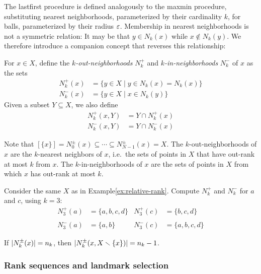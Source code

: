 \documentclass[
]{article}
\begin{document}
The lastfirst procedure is defined analogously to the maxmin procedure,
substituting nearest neighborhoods, parameterized by their cardinality
\(k\), for balls, parameterized by their radius \(\varepsilon\). Membership in
nearest neighborhoods is not a symmetric relation: It may be that
\(y \in N_k(x)\) while \(x \notin N_k(y)\). We therefore introduce a
companion concept that reverses this relationship:

\begin{definition}[$k$-neighborhoods]
    For $x \in X$, define the \emph{$k$-out-neighborhoods} $N^+_k$ and \emph{$k$-in-neighborhoods} $N^-_k$ of $x$ as the sets
    \begin{align*}
        N^+_k(x) &= \{ y\in X \mid y \in N_k(x) = N_k(x) \} \\
        N^-_k(x) &= \{ y\in X \mid x \in N_k(y) \}
    \end{align*}
    Given a subset $Y \subseteq X$, we also define
    \begin{align*}
        N^+_k(x,Y) &= Y \cap N^+_k(x) \\
        N^-_k(x,Y) &= Y \cap N^-_k(x)
    \end{align*}
\end{definition}

Note that
\([\{x\}] = N^\pm_0(x) \subseteq \cdots \subseteq N^\pm_{N-1}(x) = X\).
The \(k\)-out-neighborhoods of \(x\) are the \(k\)-nearest neighbors of
\(x\), i.e.~the sets of points in \(X\) that have out-rank at most \(k\)
from \(x\). The \(k\)-in-neighborhoods of \(x\) are the sets of points
in \(X\) from which \(x\) has out-rank at most \(k\).

\begin{example}\label{ex:rank-neighborhoods}
Consider the same $X$ as in Example\nbs\ref{ex:relative-rank}. Compute $N_k^+$ and $N_k^-$ for $a$ and $c$, using $k = 3$:
\begin{align*}
    N_3^+ (a) &= \{a, b, c, d\} &
    N_3^+ (c) &= \{b, c, d\} \\
    \\
    N_3^- (a) &= \{a, b\} &
    N_3^- (c) &= \{a, b, c, d\}
\end{align*}
\end{example}

\begin{remark}
If $\lvert N^\pm_k(x)\rvert = n_k$, then $\lvert N^\pm_k(x,X\smallsetminus\{x\})\rvert = n_k - 1$.
\end{remark}

\hypertarget{rank-sequences-and-landmark-selection}{%
\subsubsection{Rank sequences and landmark
selection}\label{rank-sequences-and-landmark-selection}}
\end{document}
